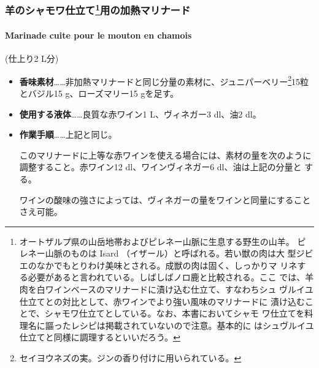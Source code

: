 \begin{recette}
{\subsubsection[羊のシャモワ仕立て用の加熱マリナード]{\texorpdfstring{羊のシャモワ仕立て\footnote{オートザルプ県の山岳地帯およびピレネー山脈に生息する野生の山羊。
  ピレネー山脈のものは Isard （イザール）と呼ばれる。若い獣の肉は大
  型ジビエのなかでもとりわけ美味とされる。成獣の肉は固く、しっかりマ
  リネする必要があると言われている。しばしばノロ鹿と比較される。ここ
  では、羊肉を白ワインベースのマリナードに漬け込む仕立て、すなわちシュ
  ヴルイユ仕立てとの対比として、赤ワインでより強い風味のマリナードに
  漬け込むことで、シャモワ仕立てとしている。なお、本書においてシャモ
  ワ仕立てを料理名に謳ったレシピは掲載されていないので注意。基本的に
  はシュヴルイユ仕立てと同様に調理するといいだろう。}用の加熱マリナード}{羊のシャモワ仕立て用の加熱マリナード}}\label{ux7f8aux306eux30b7ux30e3ux30e2ux30efux4ed5ux7acbux30668ux7528ux306eux52a0ux71b1ux30deux30eaux30caux30fcux30c9}}

\hypertarget{marinade-cuite-pour-le-mouton-en-chamois}{%
\paragraph{Marinade cuite pour le mouton en
chamois}\label{marinade-cuite-pour-le-mouton-en-chamois}}


(仕上り2 L分)

\begin{itemize}
\item
  \textbf{香味素材}\ldots{}\ldots{}非加熱マリナードと同じ分量の素材に、ジュニパーベリー\footnote{セイヨウネズの実。ジンの香り付けに用いられている。}15粒とバジル15
  g、ローズマリー15 gを足す。
\item
  \textbf{使用する液体}\ldots{}\ldots{}良質な赤ワイン1\undemi{}
  L、ヴィネガー3 dl、油2\undemi{} dl。
\item
  \textbf{作業手順}\ldots{}\ldots{}上記と同じ。

  このマリナードに上等な赤ワインを使える場合には、素材の量を次のように
  調整すること。赤ワイン12 dl、ワインヴィネガー6 dl、油は上記の分量と
  する。

  ワインの酸味の強さによっては、ヴィネガーの量をワインと同量にすることさえ可能。
\end{itemize}


\end{recette}

